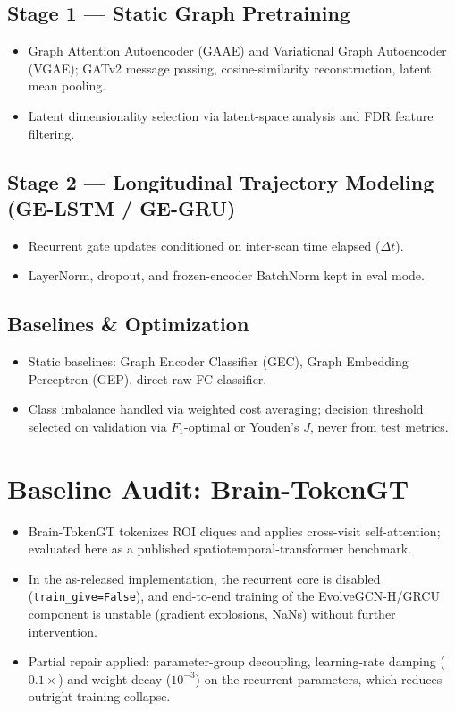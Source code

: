 \documentclass[11pt,a4paper]{article}
\begin{document}
\subsection{Stage 1 --- Static Graph Pretraining}
\begin{itemize}
  \item Graph Attention Autoencoder (GAAE) and Variational Graph Autoencoder
    (VGAE); GATv2 message passing, cosine-similarity reconstruction, latent
    mean pooling.
  \item Latent dimensionality selection via latent-space analysis and FDR
    feature filtering.
\end{itemize}

\subsection{Stage 2 --- Longitudinal Trajectory Modeling (GE-LSTM / GE-GRU)}
\begin{itemize}
  \item Recurrent gate updates conditioned on inter-scan time elapsed
    ($\Delta t$).
  \item LayerNorm, dropout, and frozen-encoder BatchNorm kept in eval mode.
\end{itemize}

\subsection{Baselines \& Optimization}
\begin{itemize}
  \item Static baselines: Graph Encoder Classifier (GEC), Graph Embedding
    Perceptron (GEP), direct raw-FC classifier.
  \item Class imbalance handled via weighted cost averaging; decision
    threshold selected on validation via $F_1$-optimal or Youden's $J$, never
    from test metrics.
\end{itemize}

\section{Baseline Audit: Brain-TokenGT}
\begin{itemize}
  \item Brain-TokenGT tokenizes ROI cliques and applies cross-visit
    self-attention; evaluated here as a published spatiotemporal-transformer
    benchmark.
  \item In the as-released implementation, the recurrent core is disabled
    (\texttt{train\_give=False}), and end-to-end training of the
    EvolveGCN-H/GRCU component is unstable (gradient explosions, NaNs)
    without further intervention.
  \item Partial repair applied: parameter-group decoupling, learning-rate
    damping ($0.1\times$) and weight decay ($10^{-3}$) on the recurrent
    parameters, which reduces outright training collapse.
\end{itemize}
\end{document}
